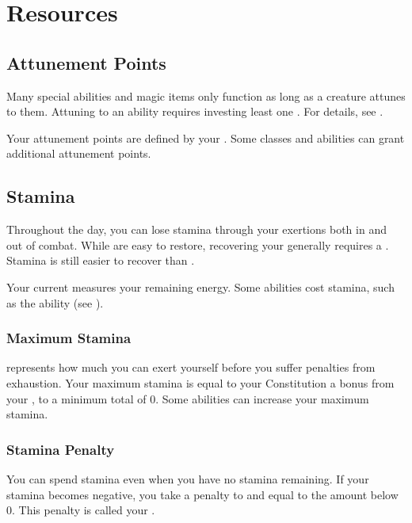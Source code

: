 \section{Resources}\label{Resources}

  \subsection{Attunement Points}\label{Attunement Points}
    Many special abilities and magic items only function as long as a creature attunes to them.
    Attuning to an ability requires investing least one .
    For details, see .

    Your attunement points are defined by your .
    Some classes and abilities can grant additional attunement points.

  \subsection{Stamina}\label{Stamina}
    Throughout the day, you can lose stamina through your exertions both in and out of combat.
    While  are easy to restore, recovering your  generally requires a .
    Stamina is still easier to recover than .

    Your current  measures your remaining energy.
    Some abilities cost stamina, such as the  ability (see ).

    \subsubsection{Maximum Stamina}\label{Maximum Stamina}
       represents how much you can exert yourself before you suffer penalties from exhaustion.
      Your maximum stamina is equal to your Constitution \add a bonus from your , to a minimum total of 0.
      Some abilities can increase your maximum stamina.

    \subsubsection{Stamina Penalty}\label{Stamina Penalty}
      You can spend stamina even when you have no stamina remaining.
      If your stamina becomes negative, you take a penalty to  and  equal to the amount below 0.
      This penalty is called your .

